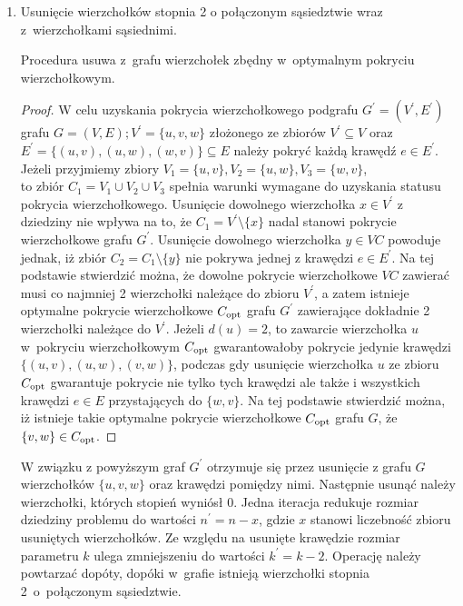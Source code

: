 \begin{enumerate}
  \item Usunięcie wierzchołków stopnia 2 o połączonym sąsiedztwie wraz z~wierzchołkami sąsiednimi.   
    \begin{theorem}
      Procedura usuwa z~grafu wierzchołek zbędny w~optymalnym pokryciu wierzchołkowym.
    \end{theorem}
    \begin{proof}
      W celu uzyskania pokrycia wierzchołkowego podgrafu $G^\prime=(V^\prime,E^\prime)$
      grafu $G=(V,E); V^\prime=\{u, v, w\}$ złożonego ze zbiorów $ V^\prime \subseteq V$ oraz $E^\prime=\{(u,v), (u,w), (w,v)\} \subseteq E$ należy pokryć każdą krawędź $e \in E^\prime$.\\ 
      Jeżeli przyjmiemy zbiory ${V_1=\{u,v\}, V_2=\{u,w\}, V_3=\{w,v\}}$,\\ 
      to zbiór ${C_1=V_1 \cup V_2 \cup V_3}$ spełnia warunki wymagane do uzyskania 
      statusu pokrycia wierzchołkowego.
      Usunięcie dowolnego wierzchołka $x \in V^\prime$ z dziedziny nie wpływa na to, że 
      ${C_1=V^\prime \setminus \{x\}}$ nadal stanowi pokrycie wierzchołkowe grafu $G^\prime$.
      Usunięcie dowolnego wierzchołka $y \in VC$ powoduje jednak, iż zbiór
      $C_2=C_1 \setminus \{y\}$ nie pokrywa jednej z krawędzi $e \in E^\prime$.
      Na tej podstawie stwierdzić można, że dowolne pokrycie wierzchołkowe
      $VC$ zawierać musi co najmniej 2 wierzchołki należące do zbioru $V^\prime$, a zatem
      istnieje optymalne pokrycie wierzchołkowe $C_{\textnormal{opt}}$ grafu $G^\prime$
      zawierające dokładnie 2 wierzchołki należące do $V^\prime$.
      Jeżeli $d(u)=2$, to zawarcie wierzchołka $u$ w~pokryciu wierzchołkowym $C_{\textnormal{opt}}$ gwarantowałoby pokrycie jedynie krawędzi
      $\{(u,v), (u,w), (v,w)\}$, podczas gdy usunięcie wierzchołka $u$ ze zbioru $C_{\textnormal{opt}}$ gwarantuje 
      pokrycie nie tylko tych krawędzi ale także i wszystkich krawędzi $e \in E$ przystających do $\{w, v\}$.
      Na tej podstawie stwierdzić można, iż istnieje takie optymalne pokrycie wierzchołkowe $C_{\textnormal{opt}}$ grafu $G$, że $\{v,w\} \in C_{\textnormal{opt}}$.
    \end{proof}
    W związku z powyższym graf $G^\prime$ otrzymuje się przez usunięcie z grafu
    $G$ wierzchołków $\{u,v,w\}$ oraz krawędzi pomiędzy nimi.
    Następnie usunąć należy wierzchołki, których stopień wyniósł 0.
    Jedna iteracja redukuje rozmiar dziedziny problemu do wartości
    $n^\prime=n-x$, gdzie $x$ stanowi liczebność zbioru usuniętych wierzchołków.
    Ze względu na usunięte krawędzie rozmiar parametru $k$ ulega zmniejszeniu 
    do wartości $k^\prime=k-2$.
    Operację należy powtarzać dopóty, dopóki w~grafie istnieją wierzchołki stopnia 2\
    o~połączonym sąsiedztwie.


\end{enumerate}
